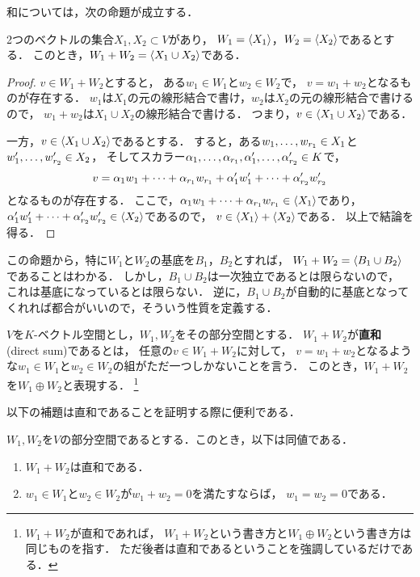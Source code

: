 和については，次の命題が成立する．
\begin{prop}\label{prop:gen_sum}
  2つのベクトルの集合$X_1,X_2 \subset V$があり，
  $W_1 = \gen{X_1}$，$W_2 = \gen{X_2}$であるとする．
  このとき，$W_1 + W_2 = \gen{X_1 \cup X_2}$である．
\end{prop}
\begin{proof}
  $v \in W_1 + W_2$とすると，
  ある$w_1 \in W_1$と$w_2 \in W_2$で，
  $v=w_1+w_2$となるものが存在する．
  $w_1$は$X_1$の元の線形結合で書け，$w_2$は$X_2$の元の線形結合で書けるので，
  $w_1 + w_2$は$X_1 \cup X_2$の線形結合で書ける．
  つまり，$v \in \gen{X_1 \cup X_2}$である．

  一方，$v \in \gen{X_1 \cup X_2}$であるとする．
  すると，ある$\idxdot{w}{1}{r_1}\in X_1$と$\idxdot{w'}{1}{r_2} \in X_2$，
  そしてスカラー$\idxdot{\alpha}{1}{r_1},\idxdot{\alpha'}{1}{r_2} \in K$で，
  \[
    v = \lncmb{\alpha}{w}{1}{r_1}{+} + \lncmb{\alpha'}{w'}{1}{r_2}{+}
  \]
  となるものが存在する．
  ここで，$\lncmb{\alpha}{w}{1}{r_1}{+} \in \gen{X_1}$であり，
  $\lncmb{\alpha'}{w'}{1}{r_2}{+} \in \gen{X_2}$であるので，
  $v \in \gen{X_1} + \gen{X_2}$である．
  以上で結論を得る．
\end{proof}
この命題から，特に$W_1$と$W_2$の基底を$B_1$，$B_2$とすれば，
$W_1 + W_2 = \gen{B_1 \cup B_2}$であることはわかる．
しかし，$B_1 \cup B_2$は一次独立であるとは限らないので，
これは基底になっているとは限らない．
逆に，$B_1 \cup B_2$が自動的に基底となってくれれば都合がいいので，そういう性質を定義する．
\begin{dfn}
  $V$を$K$-ベクトル空間とし，$W_1,W_2$をその部分空間とする．
  $W_1 + W_2$が\textbf{直和} (direct sum)であるとは，
  任意の$v \in W_1 + W_2$に対して，
  $v = w_1 + w_2$となるような$w_1 \in W_1$と$w_2 \in W_2$の組がただ一つしかないことを言う．
  このとき，$W_1 + W_2$を$W_1 \oplus W_2$と表現する．
  \footnote{$W_1 + W_2$が直和であれば，
  $W_1 + W_2$という書き方と$W_1 \oplus W_2$という書き方は同じものを指す．
  ただ後者は直和であるということを強調しているだけである．}
\end{dfn}
以下の補題は直和であることを証明する際に便利である．
\begin{lemma} \label{lemma:dsum_zero}
  $W_1,W_2$を$V$の部分空間であるとする．このとき，以下は同値である．
  \begin{enumerate}
    \item $W_1 + W_2$は直和である．
    \item $w_1 \in W_1$と$w_2 \in W_2$が$w_1 + w_2 = 0$を満たすならば，
      $w_1 = w_2 = 0$である．
  \end{enumerate}
\end{lemma}
